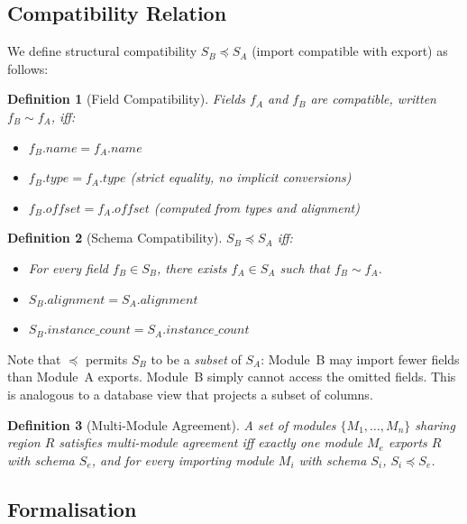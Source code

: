 \documentclass[sigplan,nonacm,screen]{acmart}
\newtheorem{definition}{Definition}
\begin{document}
\subsection{Compatibility Relation}

We define structural compatibility $S_B \preceq S_A$ (import compatible
with export) as follows:

\begin{definition}[Field Compatibility]
Fields $f_A$ and $f_B$ are compatible, written $f_B \sim f_A$, iff:
\begin{itemize}
  \item $f_B.\mathit{name} = f_A.\mathit{name}$
  \item $f_B.\mathit{type} = f_A.\mathit{type}$ (strict equality, no implicit conversions)
  \item $f_B.\mathit{offset} = f_A.\mathit{offset}$ (computed from types and alignment)
\end{itemize}
\end{definition}

\begin{definition}[Schema Compatibility]
$S_B \preceq S_A$ iff:
\begin{itemize}
  \item For every field $f_B \in S_B$, there exists $f_A \in S_A$ such that $f_B \sim f_A$.
  \item $S_B.\mathit{alignment} = S_A.\mathit{alignment}$
  \item $S_B.\mathit{instance\_count} = S_A.\mathit{instance\_count}$
\end{itemize}
\end{definition}

Note that $\preceq$ permits $S_B$ to be a \emph{subset} of $S_A$:
Module~B may import fewer fields than Module~A exports. Module~B simply
cannot access the omitted fields. This is analogous to a database view
that projects a subset of columns.

\begin{definition}[Multi-Module Agreement]
A set of modules $\{M_1, \ldots, M_n\}$ sharing region $R$ satisfies
multi-module agreement iff exactly one module $M_e$ exports $R$ with
schema $S_e$, and for every importing module $M_i$ with schema $S_i$,
$S_i \preceq S_e$.
\end{definition}

\subsection{Formalisation}
\end{document}

